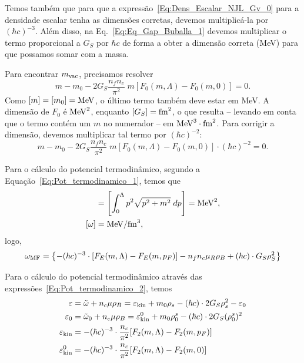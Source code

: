 Temos também que para que a expressão~\eqref{Eq:Dens_Escalar_NJL_Gv_0} para a densidade escalar tenha as dimensões corretas, devemos multiplicá-la por $(\hbar c)^{-3}$. Além disso, na Eq.~\eqref{Eq:Eq_Gap_Buballa_1} devemos multiplicar o termo proporcional a $G_S$ por $\hbar c$ de forma a obter a dimensão correta (MeV) para que possamos somar com a massa.

Para encontrar $m_{\rm{vac}}$, precisamos resolver
\begin{equation}
	m - m_0 - 2G_S\frac{n_f n_c}{\pi^2} \;m [F_0(m, \Lambda) - F_0(m,0)] = 0.
\end{equation}
%
Como $[m] = [m_0] = \rm{MeV}$, o último termo também deve estar em MeV. A dimensão de $F_0$ é $\rm{MeV}^2$, enquanto $[G_S] = \rm{fm}^2$, o que resulta -- levando em conta que o termo contém um $m$ no numerador -- em $\rm{MeV}^3\cdot\rm{fm}^2$. Para corrigir a dimensão, devemos multiplicar tal termo por $(\hbar c)^{-2}$:
\begin{equation}
	m - m_0 - 2G_S\frac{n_f n_c}{\pi^2} \;m [F_0(m, \Lambda) - F_0(m,0)] \cdot (\hbar c)^{-2} = 0.
\end{equation}

Para o cálculo do potencial termodinâmico, segundo a Equação~\ref{Eq:Pot_termodinamico_1}, temos que
\begin{align}
	[F_E] &= \left[\int_0^\Lambda p^2\sqrt{p^2+m^2} \;dp\right] = \rm{MeV}^2, \\
	[\omega] &= \rm{MeV}/\rm{fm}^3,
\end{align}
%
logo,
\begin{equation}
	\omega_{\rm{MF}} = \left\{- (\hbar c)^{-3} \cdot [F_E(m, \Lambda) - F_E(m, p_F)] - n_fn_c\mu_R\rho_B + (\hbar c) \cdot G_S\rho_S^2\right\}
\end{equation}

Para o cálculo do potencial termodinâmico através das expressões~\eqref{Eq:Pot_termodinamico_2}, temos
\begin{subequations}
\begin{align}
	\varepsilon &= \tilde{\omega} + n_c\mu\rho_B = \varepsilon_{\rm{kin}} + m_0\rho_s - (\hbar c) \cdot 2G_S\rho_s^2 - \varepsilon_0\\
	\varepsilon_0 &= \tilde{\omega}_0 + n_c\mu\rho_B = \varepsilon_{\rm{kin}}^0 + m_0\rho_0^s - (\hbar c) \cdot 2G_S(\rho_0^s)^2 \\
	\varepsilon_{\rm{kin}} &= -(\hbar c)^{-3} \cdot \frac{n_c}{\pi^2} [F_2(m, \Lambda) - F_2(m, p_F)] \\
	\varepsilon_{\rm{kin}}^0 &= -(\hbar c)^{-3} \cdot \frac{n_c}{\pi^2} [F_2(m, \Lambda) - F_2(m, 0)]
\end{align}
\end{subequations}

